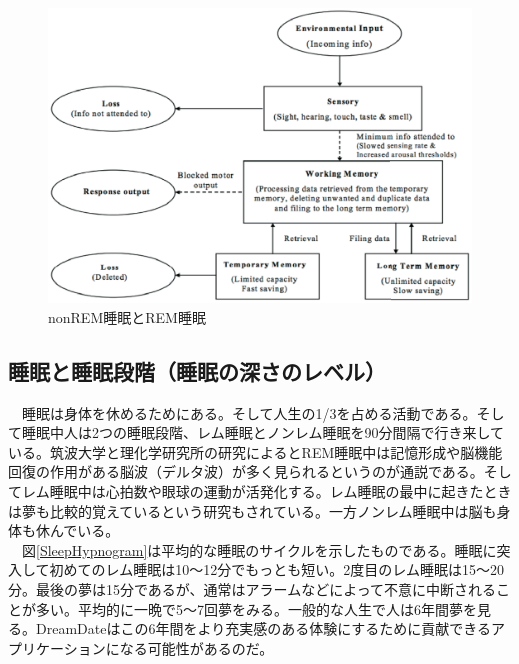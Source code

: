 \begin{figure}[htbp]
\begin{center}
\includegraphics[width=15cm]{eps/sleepBrainModel.eps}
\caption{nonREM睡眠とREM睡眠}
\label{brainZhang}
\end{center}
\end{figure}

\subsection{睡眠と睡眠段階（睡眠の深さのレベル）}
　睡眠は身体を休めるためにある。そして人生の1/3を占める活動である。そして睡眠中人は2つの睡眠段階、レム睡眠とノンレム睡眠を90分間隔で行き来している\cite{Dement}。筑波大学と理化学研究所の研究によるとREM睡眠中は記憶形成や脳機能回復の作用がある脳波（デルタ波）が多く見られるというのが通説である\cite{tsukuba}。そしてレム睡眠中は心拍数や眼球の運動が活発化する。レム睡眠の最中に起きたときは夢も比較的覚えているという研究もされている\cite{remNonRem}。一方ノンレム睡眠中は脳も身体も休んでいる。\\
　図\ref{SleepHypnogram}は平均的な睡眠のサイクルを示したものである\cite{hypnogram}。睡眠に突入して初めてのレム睡眠は10〜12分でもっとも短い。2度目のレム睡眠は15〜20分。最後の夢は15分であるが、通常はアラームなどによって不意に中断されることが多い。平均的に一晩で5〜7回夢をみる。一般的な人生で人は6年間夢を見る。DreamDateはこの6年間をより充実感のある体験にするために貢献できるアプリケーションになる可能性があるのだ。


